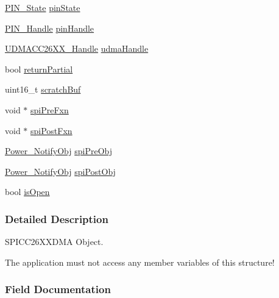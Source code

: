 \begin{DoxyCompactItemize}
\item 
\hyperlink{_p_i_n_8h_a36ef69d50df6baa6973482669c24a522}{P\+I\+N\+\_\+\+State} \hyperlink{struct_s_p_i_c_c26_x_x___object_a44cd8db1ee357299536e7a2646e304b2}{pin\+State}
\item 
\hyperlink{_p_i_n_8h_afb2de52b054638f63c39df1f30a0d88d}{P\+I\+N\+\_\+\+Handle} \hyperlink{struct_s_p_i_c_c26_x_x___object_a1cf54e17c9c9bda21af9de9f5ce672b8}{pin\+Handle}
\item 
\hyperlink{_u_d_m_a_c_c26_x_x_8h_a969a9feb0f822c4764ef1da2ff5066cf}{U\+D\+M\+A\+C\+C26\+X\+X\+\_\+\+Handle} \hyperlink{struct_s_p_i_c_c26_x_x___object_a1c92976c3583ba7a873e318c147be4f4}{udma\+Handle}
\item 
bool \hyperlink{struct_s_p_i_c_c26_x_x___object_a9a9195eeb78008c23cbb6f3297854753}{return\+Partial}
\item 
uint16\+\_\+t \hyperlink{struct_s_p_i_c_c26_x_x___object_af9de6127395082bb9b1449af0762e4ad}{scratch\+Buf}
\item 
void $\ast$ \hyperlink{struct_s_p_i_c_c26_x_x___object_a4ecd6275e390c3c37245d65f135fd829}{spi\+Pre\+Fxn}
\item 
void $\ast$ \hyperlink{struct_s_p_i_c_c26_x_x___object_a5cf441f9689eb0548478d8eef105d9cb}{spi\+Post\+Fxn}
\item 
\hyperlink{struct_power___notify_obj}{Power\+\_\+\+Notify\+Obj} \hyperlink{struct_s_p_i_c_c26_x_x___object_a2468307877f8a031156937f452becf98}{spi\+Pre\+Obj}
\item 
\hyperlink{struct_power___notify_obj}{Power\+\_\+\+Notify\+Obj} \hyperlink{struct_s_p_i_c_c26_x_x___object_ad5d62652fb04c0cc1d27e20beaaa7d8f}{spi\+Post\+Obj}
\item 
bool \hyperlink{struct_s_p_i_c_c26_x_x___object_aad3b6548b2adec791c856b725f3d768b}{is\+Open}
\end{DoxyCompactItemize}


\subsubsection{Detailed Description}
S\+P\+I\+C\+C26\+X\+X\+D\+M\+A Object. 

The application must not access any member variables of this structure! 

\subsubsection{Field Documentation}
